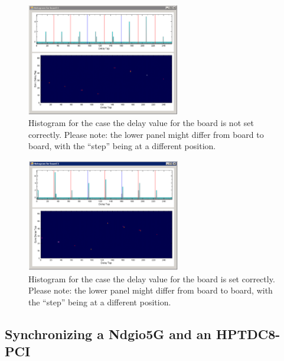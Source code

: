         \begin{figure}[ht]
            \begin{center}
                \includegraphics[width=0.6\textwidth]{figures/HistoUncalib.pdf}
                \caption{Histogram for the case the delay value for the board is not set correctly. Please note: the lower panel might differ from board to board, with the ``step'' being at a different position.\label{fig:HistoUncalib}}
            \end{center}
        \end{figure}
        
        \begin{figure}[hb]
            \begin{center}
                \includegraphics[width=0.6\textwidth]{figures/HistoCalib.pdf}
                \caption{Histogram for the case the delay value for the board is set correctly. Please note: the lower panel might differ from board to board, with the ``step'' being at a different position.\label{fig:HistoCalib}}
            \end{center}
        \end{figure}
    
    \subsection{Synchronizing a Ndgio5G and an HPTDC8-PCI}
    
